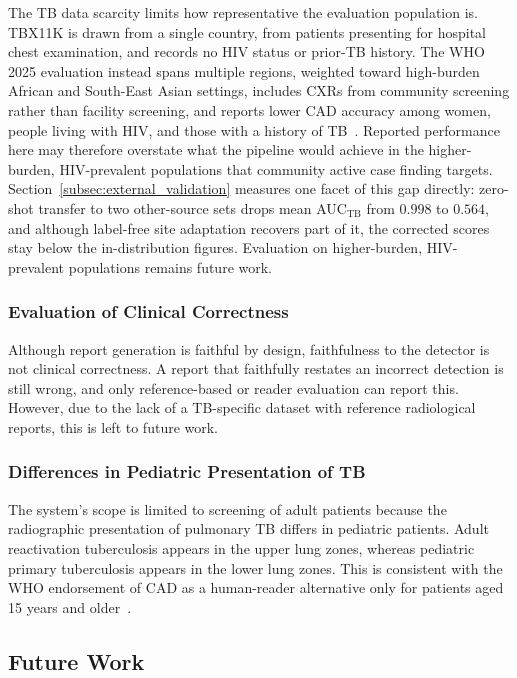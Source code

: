 \documentclass[conference, letterpaper]{IEEEtran}
\begin{document}
The TB data scarcity limits how representative the evaluation population is. TBX11K is drawn from a single country, from patients presenting for hospital chest examination, and records no HIV status or prior-TB history. The WHO 2025 evaluation instead spans multiple regions, weighted toward high-burden African and South-East Asian settings, includes CXRs from community screening rather than facility screening, and reports lower CAD accuracy among women, people living with HIV, and those with a history of TB~\cite{who_cad_approval_2025}. Reported performance here may therefore overstate what the pipeline would achieve in the higher-burden, HIV-prevalent populations that community active case finding targets. Section~\ref{subsec:external_validation} measures one facet of this gap directly: zero-shot transfer to two other-source sets drops mean AUC$_{\text{TB}}$ from $0.998$ to $0.564$, and although label-free site adaptation recovers part of it, the corrected scores stay below the in-distribution figures. Evaluation on higher-burden, HIV-prevalent populations remains future work.

\subsubsection{Evaluation of Clinical Correctness}

Although report generation is faithful by design, faithfulness to the detector is not clinical correctness. A report that faithfully restates an incorrect detection is still wrong, and only reference-based or reader evaluation can report this. However, due to the lack of a TB-specific dataset with reference radiological reports, this is left to future work.

\subsubsection{Differences in Pediatric Presentation of TB}

The system's scope is limited to screening of adult patients because the radiographic presentation of pulmonary TB differs in pediatric patients. Adult reactivation tuberculosis appears in the upper lung zones, whereas pediatric primary tuberculosis appears in the lower lung zones. This is consistent with the WHO endorsement of CAD as a human-reader alternative only for patients aged 15 years and older~\cite{who_cad_policy_2021}. 

\subsection{Future Work}
\end{document}
